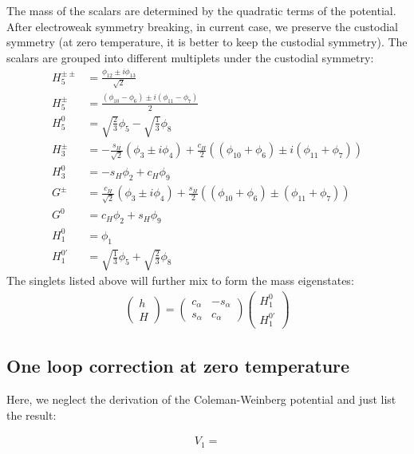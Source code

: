 \documentclass[12pt]{article}
\begin{document}
The mass of the scalars are determined by the quadratic terms of the potential. After electroweak symmetry breaking, in current case, we preserve the custodial symmetry (at zero temperature, it is better to keep the custodial symmetry). The scalars are grouped into different multiplets under the custodial symmetry:
\begin{subequations}
    \begin{align}
        H_5^{\pm\pm} &= \frac{\phi_{12}\pm i\phi_{13}}{\sqrt{2}}\\
        H_5^\pm &= \frac{(\phi_{10}-\phi_6) \pm i(\phi_{11}-\phi_7)}{2}\\
        H_5^0 &= \sqrt{\frac{2}{3}}\phi_5 - \sqrt{\frac{1}{3}}\phi_8\\
        H_3^\pm &= - \frac{s_H}{\sqrt{2}}(\phi_3\pm i\phi_4) + \frac{c_H}{2}((\phi_{10}+\phi_6)\pm i(\phi_{11}+\phi_7))\\
        H_3^0 &= -s_H \phi_2 + c_H \phi_9\\
        G^\pm &= \frac{c_H}{\sqrt{2}}(\phi_3\pm i\phi_4)+\frac{s_H}{2}((\phi_{10}+\phi_6)\pm(\phi_{11}+\phi_7))\\
        G^0 &= c_H \phi_2 + s_H \phi_9\\
        H_1^0 &= \phi_1 \\
        H_1^{0\prime} &= \sqrt{\frac{1}{3}}\phi_5 + \sqrt{\frac{2}{3}}\phi_8
    \end{align}
\end{subequations}
The singlets listed above will further mix to form the mass eigenstates:
\begin{align}
\begin{pmatrix}
    h\\
    H
\end{pmatrix} = \begin{pmatrix}
    c_\alpha & -s_\alpha \\
    s_\alpha & c_\alpha
\end{pmatrix}\begin{pmatrix}
    H_1^0\\
    H_1^{0\prime}
\end{pmatrix}
\end{align}



\subsection{One loop correction at zero temperature}

Here, we neglect the derivation of the Coleman-Weinberg potential and just list the result:

\begin{align}
    V_1 =
\end{align}




\end{document}
